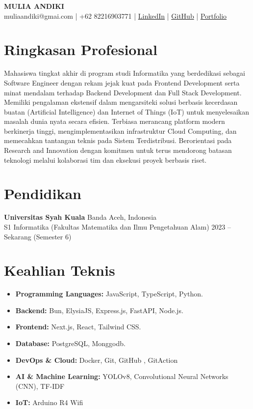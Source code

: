 \documentclass[11pt,a4paper]{article}
\begin{document}
\begin{center}
    {\huge \textbf{MULIA ANDIKI}} \\ \vspace{4pt}
    muliaandiki@gmai.com | +62 82216903771 | \href{https://www.linkedin.com/in/mulia-andiki-030457331}{LinkedIn} | \href{https://github.com/MuliaAndiki}{GitHub} | \href{https://fortopolio-nu.vercel.app}{Portfolio}
\end{center}

\section*{Ringkasan Profesional}
Mahasiswa tingkat akhir di program studi Informatika yang berdedikasi sebagai Software Engineer dengan rekam jejak kuat pada Frontend Development serta minat mendalam terhadap Backend Development dan Full Stack Development. Memiliki pengalaman ekstensif dalam mengarsiteki solusi berbasis kecerdasan buatan (Artificial Intelligence) dan Internet of Things (IoT) untuk menyelesaikan masalah dunia nyata secara efisien. Terbiasa merancang platform modern berkinerja tinggi, mengimplementasikan infrastruktur Cloud Computing, dan memecahkan tantangan teknis pada Sistem Terdistribusi. Berorientasi pada Research and Innovation dengan komitmen untuk terus mendorong batasan teknologi melalui kolaborasi tim dan eksekusi proyek berbasis riset.

\section*{Pendidikan}
\textbf{Universitas Syah Kuala} \hfill Banda Aceh, Indonesia \\
S1 Informatika (Fakultas Matematika dan Ilmu Pengetahuan Alam) \hfill 2023 -- Sekarang (Semester 6) 

\section*{Keahlian Teknis}
\begin{itemize}[leftmargin=0.15in, label={}]
    \item \textbf{Programming Languages:} JavaScript, TypeScript, Python.
    \item \textbf{Backend:} Bun, ElysiaJS, Express.js, FastAPI, Node.js.
    \item \textbf{Frontend:} Next.js, React, Tailwind CSS.
    \item \textbf{Database:} PostgreSQL, Monggodb.
    \item \textbf{DevOps \& Cloud:} Docker, Git, GitHub , GitAction
    \item \textbf{AI \& Machine Learning:} YOLOv8, Convolutional Neural Networks (CNN), TF-IDF 
    \item \textbf{IoT:} Arduino R4 Wifi
\end{itemize}
\end{document}
